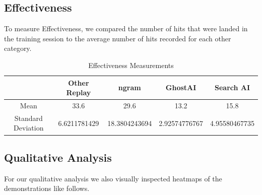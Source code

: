 \subsection{Effectiveness}
To measure Effectiveness, we compared the number of hits that were landed in the training session to the average number of hits recorded for each other category.

\begin{table}[h]
	\centering
	\caption{Effectiveness Measurements}
	\begin{tabular}	{| c | c | c | c | c | }
		\hline
		& Other Replay & ngram & GhostAI & Search AI \\
		\hline
		Mean &
		33.6 &
		29.6 &
		13.2 &
		15.8\\
		\hline
		Standard Deviation &
		6.6211781429 &
		18.3804243694 &
		2.92574776767 &
		4.95580467735 \\
		\hline
	\end{tabular}
	\label{Effectiveness}
\end{table}


\subsection{Qualitative Analysis}
For our qualitative analysis we also visually inspected heatmaps of the demonstrations like follows.

